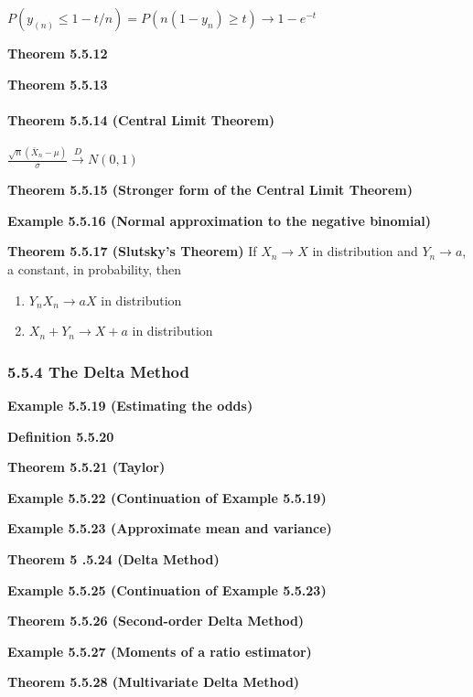 \documentclass[6pt,twocolumn,Portrait]{article}
\let\oldparagraph\paragraph
\renewcommand{\paragraph}[1]{\oldparagraph{#1}\mbox{}}
\begin{document}
\(P(y_{(n)}\le1-t/n)=P(n(1-y_n)\ge t)\to 1-e^{-t}\)

\textbf{Theorem 5.5.12}

\textbf{Theorem 5.5.13}

\hypertarget{CLT}{%
\paragraph{\texorpdfstring{\textbf{Theorem 5.5.14 (Central Limit
Theorem)}}{Theorem 5.5.14 (Central Limit Theorem)}}\label{CLT}}

\(\frac{\sqrt n(\bar X_n-\mu)}{\sigma}\overset{D}{\to}N(0,1)\)

\textbf{Theorem 5.5.15 (Stronger form of the Central Limit Theorem)}

\textbf{Example 5.5.16 (Normal approximation to the negative binomial)}

\textbf{Theorem 5.5.17 (Slutsky's Theorem)} If \(X_n\to X\) in
distribution and \(Y_n\to a\), a constant, in probability, then

\begin{enumerate}
\def\labelenumi{\alph{enumi}.}
\item
  \(Y_nX_n\to aX\) in distribution
\item
  \(X_n+Y_n\to X+a\) in distribution
\end{enumerate}

\hypertarget{the-delta-method}{%
\subsubsection{5.5.4 The Delta Method}\label{the-delta-method}}

\textbf{Example 5.5.19 (Estimating the odds)}

\textbf{Definition 5.5.20}

\textbf{Theorem 5.5.21 (Taylor)}

\textbf{Example 5.5.22 (Continuation of Example 5.5.19)}

\textbf{Example 5.5.23 (Approximate mean and variance)}

\textbf{Theorem 5 .5.24 (Delta Method)}

\textbf{Example 5.5.25 (Continuation of Example 5.5.23)}

\textbf{Theorem 5.5.26 (Second-order Delta Method)}

\textbf{Example 5.5.27 (Moments of a ratio estimator)}

\textbf{Theorem 5.5.28 (Multivariate Delta Method)}
\end{document}
